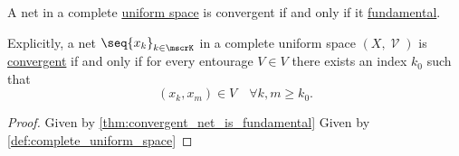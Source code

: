 \begin{theorem}\label{thm:cauchys_net_convergence_criterion}
  A net in a complete \hyperref[def:complete_uniform_space]{uniform space} is convergent if and only if it \hyperref[def:fundamental_net]{fundamental}.

  Explicitly, a net \( \seq{ x_k }_{k \in \mscrK} \) in a complete uniform space \( (X, \mscrV) \) is \hyperref[def:net_limit_point]{convergent} if and only if for every entourage \( V \in V \) there exists an index \( k_0 \) such that
  \begin{equation*}
    (x_k, x_m) \in V \quad\forall k, m \geq k_0.
  \end{equation*}
\end{theorem}
\begin{proof}
  \SufficiencySubProof Given by \cref{thm:convergent_net_is_fundamental}
  \NecessitySubProof Given by \cref{def:complete_uniform_space}
\end{proof}
